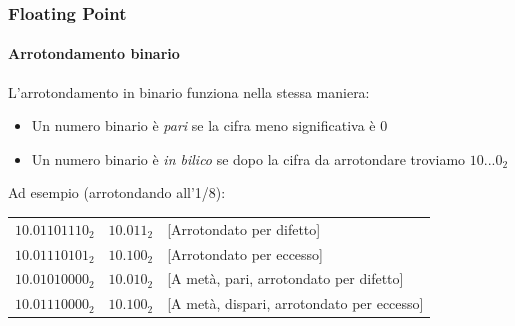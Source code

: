 \documentclass{beamer}
\begin{document}
  \begin{frame}
    \frametitle{Floating Point}
	  \framesubtitle{Arrotondamento binario}
		L'arrotondamento in binario funziona nella stessa maniera:
		\begin{itemize}
			\item Un numero binario è \emph{pari} se la cifra meno significativa è $0$
			\item Un numero binario è \emph{in bilico} se dopo la cifra da arrotondare troviamo
				$10\text{...}0_{2}$
		\end{itemize}
		\pause		
		\vspace{2em}
		Ad esempio (arrotondando all'1/8):
	    \begin{center}
	    		\begin{tabular}{ccl}
	    		$10.01101110_{2}$ & $10.011_{2}$ & [Arrotondato per difetto] \\ 
	    		$10.01110101_{2}$ & $10.100_{2}$ & [Arrotondato per eccesso] \\ 
	    		$10.01010000_{2}$ & $10.010_{2}$ & [A metà, pari, arrotondato per difetto] \\ 
	    		$10.01110000_{2}$ & $10.100_{2}$ & [A metà, dispari, arrotondato per eccesso] \\ 
	    		\end{tabular} 
	    \end{center}
  \end{frame}
\end{document}
